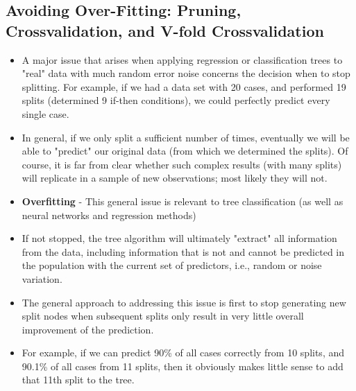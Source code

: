 \documentclass[caret-main.tex]{subfiles}
\begin{document}

\subsection{Avoiding Over-Fitting: Pruning, Crossvalidation, and V-fold Crossvalidation}
\begin{itemize}
\item A major issue that arises when applying regression or classification trees to "real" data with much random error noise concerns the decision when to stop splitting. For example, if we had a data set with 20 cases, and performed 19 splits (determined 9 if-then conditions), we could perfectly predict every single case. 
\item In general, if we only split a sufficient number of times, eventually we will be able to "predict" our original data (from which we determined the splits). Of course, it is far from clear whether such complex results (with many splits) will replicate in a sample of new observations; most likely they will not.

\item \textbf{Overfitting} -
This general issue is relevant to tree classification (as well as neural networks and regression methods)
\item  If not stopped, the tree algorithm will ultimately "extract" all information from the data, including information that is not and cannot be predicted in the population with the current set of predictors, i.e., random or noise variation.
\item The general approach to addressing this issue is first to stop generating new split nodes when subsequent splits only result in very little overall improvement of the prediction.
\item For example, if we can predict 90\% of all cases correctly from 10 splits, and 90.1\% of all cases from 11 splits, then it obviously makes little sense to add that 11th split to the tree.

\end{itemize}
\end{document}
